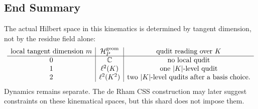 \subsection{End Summary}

The actual Hilbert space in this kinematics is determined by tangent dimension,
not by the residue field alone:
\[
\begin{array}{c|c|c}
\text{local tangent dimension }m & \mathcal H_P^{\rm geom}
  & \text{qudit reading over }K\\ \hline
0 & \mathbb C & \text{no local qudit}\\
1 & \ell^2(K) & \text{one }|K|\text{-level qudit}\\
2 & \ell^2(K^2) & \text{two }|K|\text{-level qudits after a basis choice}.
\end{array}
\]
Dynamics remains separate.  The de Rham CSS construction may later suggest
constraints on these kinematical spaces, but this shard does not impose them.
